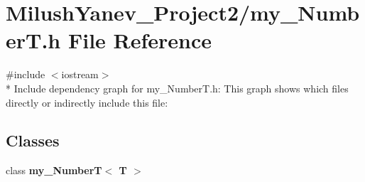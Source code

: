 \section{Milush\+Yanev\+\_\+\+Project2/my\+\_\+\+Number\+T.h File Reference}
\label{my___number_t_8h}
{\ttfamily \#include $<$iostream$>$}\\*
Include dependency graph for my\+\_\+\+Number\+T.\+h\+:
This graph shows which files directly or indirectly include this file\+:
\subsection*{Classes}
\begin{DoxyCompactItemize}
\item 
class {\bf my\+\_\+\+Number\+T$<$ T $>$}
\end{DoxyCompactItemize}
